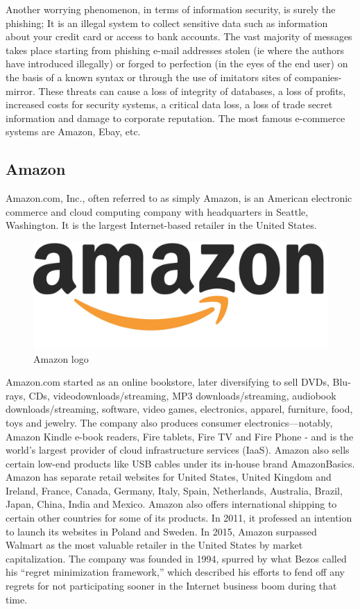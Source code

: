 Another worrying phenomenon, in terms of information security, is surely the phishing; It is an illegal system to collect sensitive data such as information about your credit card or access to bank accounts. The vast majority of messages takes place starting from phishing e-mail addresses stolen (ie where the authors have introduced illegally) or forged to perfection (in the eyes of the end user) on the basis of a known syntax or through the use of imitators sites of companies-mirror. These threats can cause a loss of integrity of databases, a loss of profits, increased costs for security systems, a critical data loss, a loss of trade secret information and damage to corporate reputation.
\newline
The most famous e-commerce systems are Amazon, Ebay, etc.
\subsection{Amazon}
Amazon.com, Inc., often referred to as simply Amazon, is an American electronic commerce and cloud computing company with headquarters in Seattle, Washington. It is the largest Internet-based retailer in the United States.
\begin{figure}[htb]
 \centering
 \includegraphics[width=0.4\linewidth]{images/chapter1/amazon_logo.jpg}\hfill
 \caption[Amazon logo]{Amazon logo}
 \label{fig:amazon_logo}
\end{figure}
Amazon.com started as an online bookstore, later diversifying to sell DVDs, Blu-rays, CDs, videodownloads/streaming, MP3 downloads/streaming, audiobook downloads/streaming, software, video games, electronics, apparel, furniture, food, toys and jewelry. The company also produces consumer electronics—notably, Amazon Kindle e-book readers, Fire tablets, Fire TV and Fire Phone - and is the world's largest provider of cloud infrastructure services (IaaS). Amazon also sells certain low-end products like USB cables under its in-house brand AmazonBasics.
\newline
Amazon has separate retail websites for United States, United Kingdom and Ireland, France, Canada, Germany, Italy, Spain, Netherlands, Australia, Brazil, Japan, China, India and Mexico.
\newline
Amazon also offers international shipping to certain other countries for some of its products. In 2011, it professed an intention to launch its websites in Poland and Sweden.
In 2015, Amazon surpassed Walmart as the most valuable retailer in the United States by market capitalization.
The company was founded in 1994, spurred by what Bezos called his “regret minimization framework,” which described his efforts to fend off any regrets for not participating sooner in the Internet business boom during that time.
